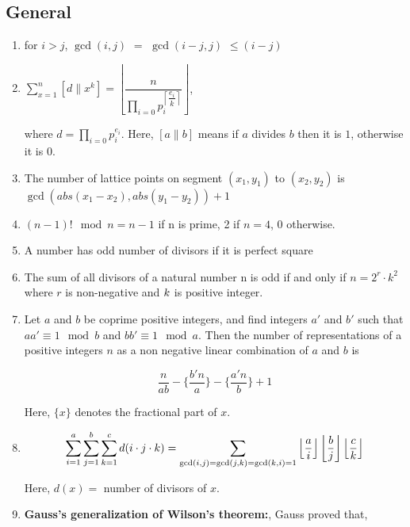 \subsection{General}
\begin{enumerate}
\item for $i > j$, $\displaystyle \gcd(i, j)$ $ = $ $\displaystyle \gcd(i -j, j)$ $\displaystyle \leq (i -j)$
\item $\displaystyle \sum_{x = 1}^n \left[ d \| x^k \right] = \left \lfloor\dfrac{n}{\prod_{i = 0}{p_i^{\left \lceil \dfrac{e_i}{k}\right \rceil}}}\right \rfloor$, 
     
     where $d = \prod_{i = 0}{p_i^{e_i}}$. Here, $[a \| b]$ means if $\displaystyle a$ divides $b$ then it is $\displaystyle 1$, otherwise it is $0$.
\item The number of lattice points on segment $\displaystyle (x_1,y_1)$ to $\displaystyle (x_2,y_2)$ is $\displaystyle \gcd(abs(x_1-x_2),abs(y_1-y_2)) + 1$
\item $\displaystyle (n-1)! \mod  n = n -1$ if n is prime, 2 if $n = 4$, $0$ otherwise.
\item A number has odd number of divisors if it is  perfect square
\item The sum of all divisors of a natural number n is odd if and only if $n=2^r\cdot k^2$ where $r$ is non-negative and $\displaystyle \displaystyle k$ is positive integer.
\item Let $\displaystyle a$ and $b$ be coprime positive integers, and find integers $\displaystyle a{\prime}$ and $b{\prime}$ such that $\displaystyle aa{\prime} \equiv 1 \mod b$ and $bb{\prime} \equiv 1 \mod a$. Then the number of representations of a positive integers \(n\) as a non negative linear combination of $\displaystyle a$ and $b$ is  
     
     $$\displaystyle \frac{n}{ab}-\Big\{\frac{b{\prime} n}{a}\Big\}-\Big\{\frac{a{\prime} n}{b}\Big\} + 1$$

     Here, $\displaystyle \{x\}$ denotes the fractional part of $\displaystyle x$.
\item $$\displaystyle \displaystyle \sum \limits_{i=1}^{a}\sum \limits_{j=1}^{b}\sum \limits_{k=1}^{c} d(i \cdot j \cdot k) = \sum \limits_{\gcd (i,j)=\gcd (j,k) = \gcd (k,i) =1} \left \lfloor \dfrac{a}{i}\right \rfloor \left \lfloor \dfrac{b}{j}\right \rfloor \left \lfloor \dfrac{c}{k} \right \rfloor$$
       
     Here, $d(x) =$ number of divisors of $\displaystyle x$.
\item \textbf{Gauss's generalization of Wilson's theorem:},  
     Gauss proved that,  
     

\end{enumerate}
